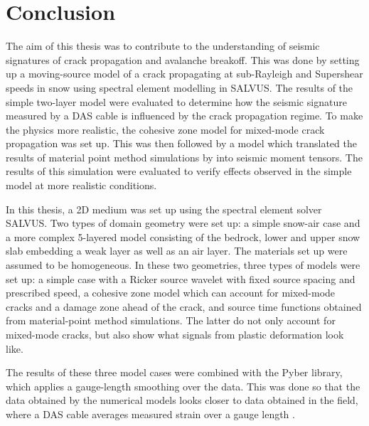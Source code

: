 \chapter{Conclusion}
\label{chap:conclusion}
%
%


The aim of this thesis was to contribute to the understanding of seismic signatures of crack propagation and avalanche breakoff. This was done
by setting up a moving-source model of a crack propagating at sub-Rayleigh and Supershear speeds in snow using spectral element modelling in SALVUS. The results of the simple two-layer model were evaluated to determine how the seismic signature measured by a DAS cable is influenced by the crack propagation regime. To make the physics more realistic, the cohesive zone model for mixed-mode crack propagation was set up. This was then followed by a model which translated the results of material point method simulations by \cite{trottetTransitionSubRayleighAnticrack2022} into seismic moment tensors. The results of this simulation were evaluated to verify effects observed in the simple model at more realistic conditions. 


In this thesis, a 2D medium was set up using the spectral element solver SALVUS. Two types of domain geometry were set up: a simple snow-air case and a more complex 5-layered model consisting of the bedrock, lower and upper snow slab embedding a weak layer as well as an air layer. The materials set up were assumed to be homogeneous. In these two geometries, three types of models were set up: a simple case with a Ricker source wavelet with fixed source spacing and prescribed speed, a cohesive zone model which can account for mixed-mode cracks and a damage zone ahead of the crack, and source time functions obtained from material-point method simulations. The latter do not only account for mixed-mode cracks, but also show what signals from plastic deformation look like. \par

The results of these three model cases were combined with the Pyber library, which applies a gauge-length smoothing over the data. This was done so that the data obtained by the numerical models looks closer to data obtained in the field, where a DAS cable averages measured strain over a gauge length \parencite{noeFrontiersFullwaveformSeismology2025,lindseyFiberOpticSeismology2021}. \par 


